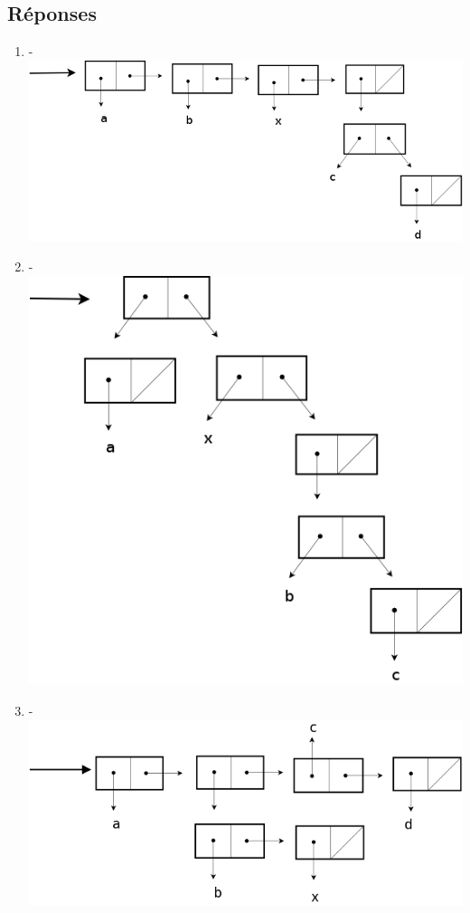 \documentclass[a4paper, 11pt]{article}
\begin{document}
\subsection{Réponses}
\begin{enumerate}
    \item -\\ \includegraphics[scale=0.3]{reponse1.png}
    \item -\\ \includegraphics[scale=0.3]{reponse2.png}
    \item -\\ \includegraphics[scale=0.3]{reponse3.png}

\end{enumerate}
\end{document}
